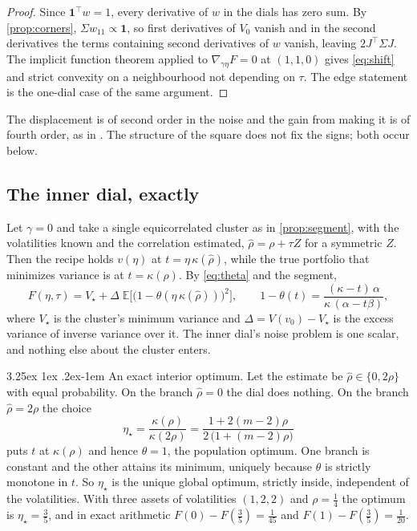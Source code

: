 \documentclass[11pt]{article}
\makeatletter
\renewcommand\paragraph{\@startsection{paragraph}{4}{\z@}%
  {3.25ex \@plus1ex \@minus.2ex}{-1em}%
  {\normalfont\normalsize\itshape}}
\newcommand{\ones}{\mathbf{1}}
\makeatother
\begin{document}
\begin{proof}
Since $\ones^\top w=1$, every derivative of $w$ in the dials has zero sum.
By \cref{prop:corners}, $\Sigma w_{11}\propto\ones$, so first derivatives
of $V_0$ vanish and in the second derivatives the terms containing second
derivatives of $w$ vanish, leaving $2J^\top\Sigma J$. The implicit function
theorem applied to $\nabla_{\gamma\eta}F=0$ at $(1,1,0)$ gives
\eqref{eq:shift} and strict convexity on a neighbourhood not depending on
$\tau$. The edge statement is the one-dial case of the same argument.
\end{proof}

The displacement is of second order in the noise and the gain from making
it is of fourth order, as in \cite{cotton2026nco}. The structure of the
square does not fix the signs; both occur below.

\subsection{The inner dial, exactly}

Let $\gamma=0$ and take a single equicorrelated cluster as in
\cref{prop:segment}, with the volatilities known and the correlation
estimated, $\widehat\rho=\rho+\tau Z$ for a symmetric $Z$. Then the recipe
holds $v(\eta)$ at $t=\eta\,\kappa(\widehat\rho)$, while the true portfolio
that minimizes variance is at $t=\kappa(\rho)$. By \eqref{eq:theta} and the
segment,
\begin{equation}
  F(\eta,\tau)=V_\star+\Delta\;\mathbb{E}\Big[\big(1-\theta(\eta\,\kappa(\widehat\rho))\big)^2\Big],
  \qquad
  1-\theta(t)=\frac{(\kappa-t)\,\alpha}{\kappa\,(\alpha-t\beta)},
  \label{eq:Fleaf}
\end{equation}
where $V_\star$ is the cluster's minimum variance and
$\Delta=V(v_0)-V_\star$ is the excess variance of inverse variance over it.
The inner dial's noise problem is one scalar, and nothing else about the
cluster enters.

\paragraph{An exact interior optimum.} Let the estimate be
$\widehat\rho\in\{0,2\rho\}$ with equal probability. On the branch
$\widehat\rho=0$ the dial does nothing. On the branch $\widehat\rho=2\rho$
the choice
\begin{equation}
  \eta_\star=\frac{\kappa(\rho)}{\kappa(2\rho)}
  =\frac{1+2(m-2)\rho}{2\,\big(1+(m-2)\rho\big)}
  \label{eq:etastar}
\end{equation}
puts $t$ at $\kappa(\rho)$ and hence $\theta=1$, the population optimum.
One branch is constant and the other attains its minimum, uniquely because
$\theta$ is strictly monotone in $t$. So $\eta_\star$ is the unique global
optimum, strictly inside, independent of the volatilities. With three
assets of volatilities $(1,2,2)$ and $\rho=\tfrac14$ the optimum is
$\eta_\star=\tfrac35$, and in exact arithmetic
$F(0)-F(\tfrac35)=\tfrac1{45}$ and $F(1)-F(\tfrac35)=\tfrac1{20}$.
\end{document}
